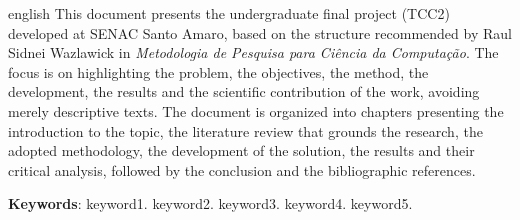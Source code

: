 \documentclass[
    12pt,                %
    openright,           %
    oneside,             %
    a4paper,             %
    english,             %
    brazil               %
]{abntex2}
\begin{document}
\begin{resumo}[Abstract]
 \begin{otherlanguage*}{english}
   This document presents the undergraduate final project (TCC2) developed at SENAC Santo Amaro, based on the structure recommended by Raul Sidnei Wazlawick in \textit{Metodologia de Pesquisa para Ciência da Computação}. The focus is on highlighting the problem, the objectives, the method, the development, the results and the scientific contribution of the work, avoiding merely descriptive texts. The document is organized into chapters presenting the introduction to the topic, the literature review that grounds the research, the adopted methodology, the development of the solution, the results and their critical analysis, followed by the conclusion and the bibliographic references.

   \vspace{\onelineskip}

   \noindent
   \textbf{Keywords}: keyword1. keyword2. keyword3. keyword4. keyword5.
 \end{otherlanguage*}
\end{resumo}

\listoffigures*
\cleardoublepage


\end{document}

